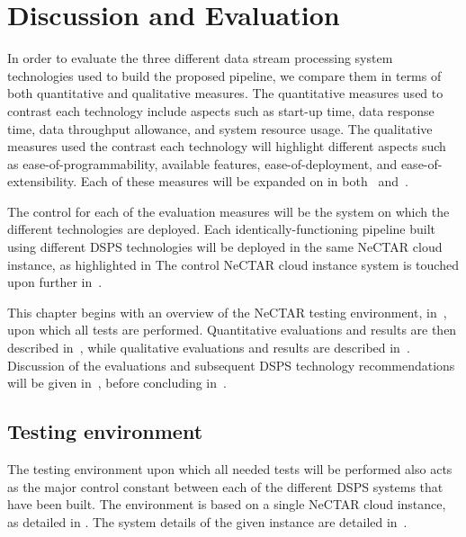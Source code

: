 \section{Discussion and Evaluation}
\label{sec:evaluation}

In order to evaluate the three different data stream processing system technologies used to build the proposed pipeline,
we compare them in terms of both quantitative and qualitative measures. The quantitative measures used to contrast
each technology include aspects such as start-up time, data response time, data throughput allowance, and system resource
usage. The qualitative measures used the contrast each technology will highlight different aspects such as ease-of-programmability,
available features, ease-of-deployment, and ease-of-extensibility. Each of these measures will be expanded on in
both~ and~.

The control for each of the evaluation measures will be the system on which the different technologies are deployed.
Each identically-functioning pipeline built using different DSPS technologies will be deployed in the same NeCTAR cloud
instance, as highlighted in%
The control NeCTAR cloud instance system is touched upon further in~.

This chapter begins with an overview of the NeCTAR testing environment, in~, upon which
all tests are performed. Quantitative evaluations and results are then described in~,
while qualitative evaluations and results are described in~. Discussion of the
evaluations and subsequent DSPS technology recommendations will be given in~,
before concluding in~.


\subsection{Testing environment} %
\label{sub:testing_environment}

The testing environment upon which all needed tests will be performed also acts as the major control constant between
each of the different DSPS systems that have been built. The environment is based on a single NeCTAR cloud instance, as detailed
in%
. The system details of the given instance are detailed in~.

